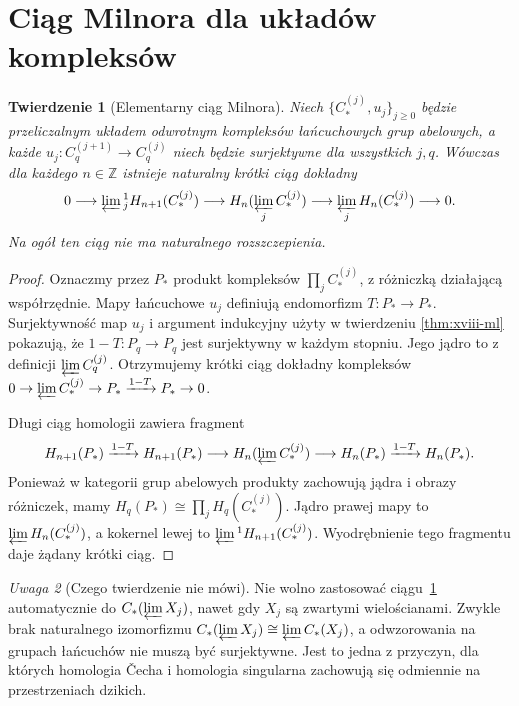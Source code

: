 \documentclass[11pt,a4paper,oneside]{report}
\newcommand{\Z}{\mathbb{Z}}
\theoremstyle{plain}
\newtheorem{twierdzenie}{Twierdzenie}[section]
\theoremstyle{definition}
\theoremstyle{remark}
\newtheorem{uwaga}[twierdzenie]{Uwaga}
\begin{document}
\section{Ciąg Milnora dla układów kompleksów}
\begin{twierdzenie}[Elementarny ciąg Milnora]
\label{thm:xviii-milnor}
Niech $\{C^{(j)}_*,u_j\}_{j\ge0}$ będzie przeliczalnym
układem odwrotnym kompleksów łańcuchowych grup abelowych,
a każde $u_j:C^{(j+1)}_q\to C^{(j)}_q$ niech będzie
surjektywne dla wszystkich $j,q$. Wówczas dla każdego $n\in\Z$
istnieje naturalny krótki ciąg dokładny
\[
0\longrightarrow\varprojlim{}^1_jH_{n+1}(C^{(j)}_*)
\longrightarrow H_n(\varprojlim_j C^{(j)}_*)
\longrightarrow\varprojlim_jH_n(C^{(j)}_*)
\longrightarrow0.
\]
Na ogół ten ciąg nie ma naturalnego rozszczepienia.
\end{twierdzenie}
\begin{proof}
Oznaczmy przez $P_*$ produkt kompleksów $\prod_j C^{(j)}_*$,
z różniczką działającą współrzędnie. Mapy łańcuchowe $u_j$
definiują endomorfizm $T:P_*\to P_*$. Surjektywność map
$u_j$ i argument indukcyjny użyty w twierdzeniu
\ref{thm:xviii-ml} pokazują, że $1-T:P_q\to P_q$
jest surjektywny w każdym stopniu. Jego jądro to z definicji
$\varprojlim C^{(j)}_q$. Otrzymujemy krótki ciąg dokładny
kompleksów $0\to\varprojlim C^{(j)}_*\to P_*
\xrightarrow{1-T}P_*\to0$.

Długi ciąg homologii zawiera fragment
\[
H_{n+1}(P_*)\xrightarrow{1-T}H_{n+1}(P_*)
\longrightarrow H_n(\varprojlim C^{(j)}_*)
\longrightarrow H_n(P_*)\xrightarrow{1-T}H_n(P_*).
\]
Ponieważ w kategorii grup abelowych produkty zachowują
jądra i obrazy różniczek, mamy
$H_q(P_*)\cong\prod_jH_q(C^{(j)}_*)$.
Jądro prawej mapy to $\varprojlim H_n(C^{(j)}_*)$,
a kokernel lewej to $\varprojlim{}^1 H_{n+1}(C^{(j)}_*)$.
Wyodrębnienie tego fragmentu daje żądany krótki ciąg.
\end{proof}
\begin{uwaga}[Czego twierdzenie nie mówi]
Nie wolno zastosować ciągu~\ref{thm:xviii-milnor}
automatycznie do $C_*(\varprojlim X_j)$, nawet gdy
$X_j$ są zwartymi wielościanami. Zwykle brak naturalnego
izomorfizmu $C_*(\varprojlim X_j)\cong\varprojlim C_*(X_j)$,
a odwzorowania na grupach łańcuchów nie muszą być surjektywne.
Jest to jedna z przyczyn, dla których homologia Čecha i homologia
singularna zachowują się odmiennie na przestrzeniach dzikich.
\end{uwaga}
\end{document}

